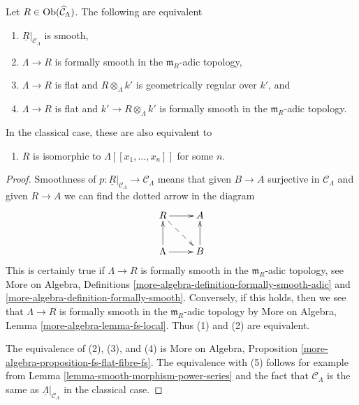 \begin{lemma}
\label{lemma-smooth}
Let $R \in \mathop{\mathrm{Ob}}\nolimits(\widehat{\mathcal{C}}_\Lambda)$. The following are
equivalent
\begin{enumerate}
\item $\underline{R}|_{\mathcal{C}_\Lambda}$ is smooth,
\item $\Lambda \to R$ is formally smooth in the $\mathfrak m_R$-adic topology,
\item $\Lambda \to R$ is flat and $R \otimes_\Lambda k'$ is
geometrically regular over $k'$, and
\item $\Lambda \to R$ is flat and $k' \to R \otimes_\Lambda k'$ is
formally smooth in the $\mathfrak m_R$-adic topology.
\end{enumerate}
In the classical case, these are also equivalent to
\begin{enumerate}
\item[(5)] $R$ is isomorphic to $\Lambda[[x_1, \ldots, x_n]]$
for some $n$.
\end{enumerate}
\end{lemma}

\begin{proof}
Smoothness of
$p : \underline{R}|_{\mathcal{C}_\Lambda} \to \mathcal{C}_\Lambda$
means that given $B \to A$ surjective in $\mathcal{C}_\Lambda$
and given $R \to A$ we can find the dotted arrow in the
diagram
$$
\xymatrix{
R \ar[r] \ar@{-->}[rd] & A \\
\Lambda \ar[r] \ar[u] & B \ar[u]
}
$$
This is certainly true if $\Lambda \to R$ is formally smooth in the
$\mathfrak m_R$-adic topology, see
More on Algebra, Definitions
\ref{more-algebra-definition-formally-smooth-adic} and
\ref{more-algebra-definition-formally-smooth}.
Conversely, if this holds, then we see that
$\Lambda \to R$ is formally smooth in the $\mathfrak m_R$-adic
topology by More on Algebra, Lemma \ref{more-algebra-lemma-fs-local}.
Thus (1) and (2) are equivalent.

\medskip\noindent
The equivalence of (2), (3), and (4) is
More on Algebra, Proposition \ref{more-algebra-proposition-fs-flat-fibre-fs}.
The equivalence with (5) follows for example from
Lemma \ref{lemma-smooth-morphism-power-series}
and the fact that $\mathcal{C}_\Lambda$ is the same
as $\underline{\Lambda}|_{\mathcal{C}_\Lambda}$ in the classical case.
\end{proof}

